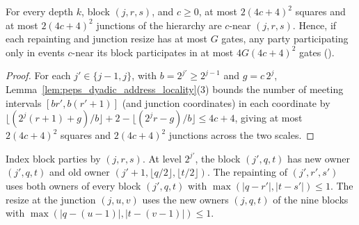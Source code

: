 \begin{lemma}
    \label{thm:peps_dyadic_lifetime_incidence}
    \leanok
    For every depth $k$, block $(j,r,s)$, and $c\ge0$, at most $2(4c+4)^2$ squares
    and at most $2(4c+4)^2$ junctions of the hierarchy are $c$-near $(j,r,s)$.
    Hence, if each repainting and junction resize has at most $G$ gates, any party
    participating only in events $c$-near its block participates in at most
    $4G(4c+4)^2$ gates (\cite[Proposition~7.1, item~2, lines 611--618]{OpenAI2026PolynomialPEPS}).
\end{lemma}

\begin{proof}\leanok
    For each $j'\in\{j-1,j\}$, with $b=2^{j'}\ge2^{j-1}$ and $g=c\,2^j$,
    Lemma~\ref{lem:peps_dyadic_address_locality}(3) bounds the number of meeting
    intervals $[br',b(r'+1)]$ (and junction coordinates) in each coordinate by
    $\lfloor(2^j(r+1)+g)/b\rfloor+2-\lfloor(2^jr-g)/b\rfloor\le4c+4$, giving at
    most $2(4c+4)^2$ squares and $2(4c+4)^2$ junctions across the two scales.
\end{proof}

\begin{definition}
    \label{def:peps_dyadic_used_parties}
    \leanok
    Index block parties by $(j,r,s)$. At level $2^{j'}$, the block $(j',q,t)$ has
    new owner $(j',q,t)$ and old owner
    $(j'+1,\lfloor q/2\rfloor,\lfloor t/2\rfloor)$. The repainting of $(j',r',s')$
    uses both owners of every block $(j',q,t)$ with $\max(|q-r'|,|t-s'|)\le1$. The
    resize at the junction $(j,u,v)$ uses the new owners $(j,q,t)$ of the nine
    blocks with $\max(|q-(u-1)|,|t-(v-1)|)\le1$.
\end{definition}

